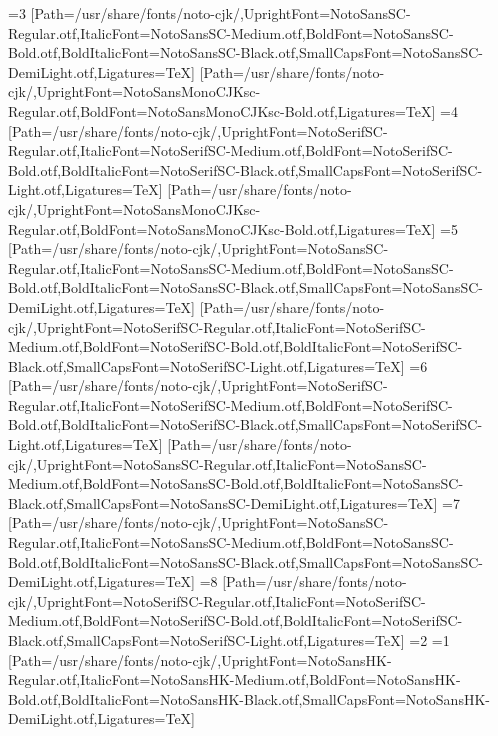 \else\ifnum\value{CJKFonts}=3
[Path=/usr/share/fonts/noto-cjk/,UprightFont=NotoSansSC-Regular.otf,ItalicFont=NotoSansSC-Medium.otf,BoldFont=NotoSansSC-Bold.otf,BoldItalicFont=NotoSansSC-Black.otf,SmallCapsFont=NotoSansSC-DemiLight.otf,Ligatures=TeX]
[Path=/usr/share/fonts/noto-cjk/,UprightFont=NotoSansMonoCJKsc-Regular.otf,BoldFont=NotoSansMonoCJKsc-Bold.otf,Ligatures=TeX]
\else\ifnum\value{CJKFonts}=4
[Path=/usr/share/fonts/noto-cjk/,UprightFont=NotoSerifSC-Regular.otf,ItalicFont=NotoSerifSC-Medium.otf,BoldFont=NotoSerifSC-Bold.otf,BoldItalicFont=NotoSerifSC-Black.otf,SmallCapsFont=NotoSerifSC-Light.otf,Ligatures=TeX]
[Path=/usr/share/fonts/noto-cjk/,UprightFont=NotoSansMonoCJKsc-Regular.otf,BoldFont=NotoSansMonoCJKsc-Bold.otf,Ligatures=TeX]
\else\ifnum\value{CJKFonts}=5
[Path=/usr/share/fonts/noto-cjk/,UprightFont=NotoSansSC-Regular.otf,ItalicFont=NotoSansSC-Medium.otf,BoldFont=NotoSansSC-Bold.otf,BoldItalicFont=NotoSansSC-Black.otf,SmallCapsFont=NotoSansSC-DemiLight.otf,Ligatures=TeX]
[Path=/usr/share/fonts/noto-cjk/,UprightFont=NotoSerifSC-Regular.otf,ItalicFont=NotoSerifSC-Medium.otf,BoldFont=NotoSerifSC-Bold.otf,BoldItalicFont=NotoSerifSC-Black.otf,SmallCapsFont=NotoSerifSC-Light.otf,Ligatures=TeX]
\else\ifnum\value{CJKFonts}=6
[Path=/usr/share/fonts/noto-cjk/,UprightFont=NotoSerifSC-Regular.otf,ItalicFont=NotoSerifSC-Medium.otf,BoldFont=NotoSerifSC-Bold.otf,BoldItalicFont=NotoSerifSC-Black.otf,SmallCapsFont=NotoSerifSC-Light.otf,Ligatures=TeX]
[Path=/usr/share/fonts/noto-cjk/,UprightFont=NotoSansSC-Regular.otf,ItalicFont=NotoSansSC-Medium.otf,BoldFont=NotoSansSC-Bold.otf,BoldItalicFont=NotoSansSC-Black.otf,SmallCapsFont=NotoSansSC-DemiLight.otf,Ligatures=TeX]
\else\ifnum\value{CJKFonts}=7
[Path=/usr/share/fonts/noto-cjk/,UprightFont=NotoSansSC-Regular.otf,ItalicFont=NotoSansSC-Medium.otf,BoldFont=NotoSansSC-Bold.otf,BoldItalicFont=NotoSansSC-Black.otf,SmallCapsFont=NotoSansSC-DemiLight.otf,Ligatures=TeX]
\else\ifnum\value{CJKFonts}=8
[Path=/usr/share/fonts/noto-cjk/,UprightFont=NotoSerifSC-Regular.otf,ItalicFont=NotoSerifSC-Medium.otf,BoldFont=NotoSerifSC-Bold.otf,BoldItalicFont=NotoSerifSC-Black.otf,SmallCapsFont=NotoSerifSC-Light.otf,Ligatures=TeX]
\fi\fi\fi\fi\fi\fi\fi\fi\else
\ifnum\value{CJKLanguage}=2
\ifnum\value{CJKFonts}=1
[Path=/usr/share/fonts/noto-cjk/,UprightFont=NotoSansHK-Regular.otf,ItalicFont=NotoSansHK-Medium.otf,BoldFont=NotoSansHK-Bold.otf,BoldItalicFont=NotoSansHK-Black.otf,SmallCapsFont=NotoSansHK-DemiLight.otf,Ligatures=TeX]
